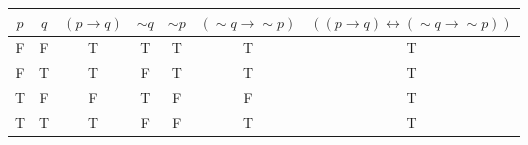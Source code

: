 \begin{tabular}{|c|c||c|c|c|c|c|}
\hline
$ p $ & $ q $ & $ (p \rightarrow q) $ & $  \sim q $ & $  \sim p $ & $ ( \sim q \rightarrow  \sim p) $ & $ ((p \rightarrow q) \leftrightarrow ( \sim q \rightarrow  \sim p)) $ \\
\hline
F & F & T & T & T & T & T \\
F & T & T & F & T & T & T \\
T & F & F & T & F & F & T \\
T & T & T & F & F & T & T \\
\hline
\end{tabular}
